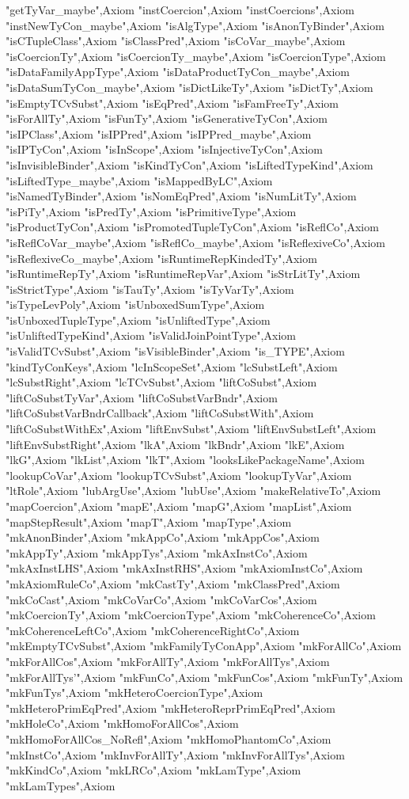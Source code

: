 {"getTyVar_maybe"},{Axiom "instCoercion"},{Axiom "instCoercions"},{Axiom "instNewTyCon_maybe"},{Axiom "isAlgType"},{Axiom "isAnonTyBinder"},{Axiom "isCTupleClass"},{Axiom "isClassPred"},{Axiom "isCoVar_maybe"},{Axiom "isCoercionTy"},{Axiom "isCoercionTy_maybe"},{Axiom "isCoercionType"},{Axiom "isDataFamilyAppType"},{Axiom "isDataProductTyCon_maybe"},{Axiom "isDataSumTyCon_maybe"},{Axiom "isDictLikeTy"},{Axiom "isDictTy"},{Axiom "isEmptyTCvSubst"},{Axiom "isEqPred"},{Axiom "isFamFreeTy"},{Axiom "isForAllTy"},{Axiom "isFunTy"},{Axiom "isGenerativeTyCon"},{Axiom "isIPClass"},{Axiom "isIPPred"},{Axiom "isIPPred_maybe"},{Axiom "isIPTyCon"},{Axiom "isInScope"},{Axiom "isInjectiveTyCon"},{Axiom "isInvisibleBinder"},{Axiom "isKindTyCon"},{Axiom "isLiftedTypeKind"},{Axiom "isLiftedType_maybe"},{Axiom "isMappedByLC"},{Axiom "isNamedTyBinder"},{Axiom "isNomEqPred"},{Axiom "isNumLitTy"},{Axiom "isPiTy"},{Axiom "isPredTy"},{Axiom "isPrimitiveType"},{Axiom "isProductTyCon"},{Axiom "isPromotedTupleTyCon"},{Axiom "isReflCo"},{Axiom "isReflCoVar_maybe"},{Axiom "isReflCo_maybe"},{Axiom "isReflexiveCo"},{Axiom "isReflexiveCo_maybe"},{Axiom "isRuntimeRepKindedTy"},{Axiom "isRuntimeRepTy"},{Axiom "isRuntimeRepVar"},{Axiom "isStrLitTy"},{Axiom "isStrictType"},{Axiom "isTauTy"},{Axiom "isTyVarTy"},{Axiom "isTypeLevPoly"},{Axiom "isUnboxedSumType"},{Axiom "isUnboxedTupleType"},{Axiom "isUnliftedType"},{Axiom "isUnliftedTypeKind"},{Axiom "isValidJoinPointType"},{Axiom "isValidTCvSubst"},{Axiom "isVisibleBinder"},{Axiom "is_TYPE"},{Axiom "kindTyConKeys"},{Axiom "lcInScopeSet"},{Axiom "lcSubstLeft"},{Axiom "lcSubstRight"},{Axiom "lcTCvSubst"},{Axiom "liftCoSubst"},{Axiom "liftCoSubstTyVar"},{Axiom "liftCoSubstVarBndr"},{Axiom "liftCoSubstVarBndrCallback"},{Axiom "liftCoSubstWith"},{Axiom "liftCoSubstWithEx"},{Axiom "liftEnvSubst"},{Axiom "liftEnvSubstLeft"},{Axiom "liftEnvSubstRight"},{Axiom "lkA"},{Axiom "lkBndr"},{Axiom "lkE"},{Axiom "lkG"},{Axiom "lkList"},{Axiom "lkT"},{Axiom "looksLikePackageName"},{Axiom "lookupCoVar"},{Axiom "lookupTCvSubst"},{Axiom "lookupTyVar"},{Axiom "ltRole"},{Axiom "lubArgUse"},{Axiom "lubUse"},{Axiom "makeRelativeTo"},{Axiom "mapCoercion"},{Axiom "mapE"},{Axiom "mapG"},{Axiom "mapList"},{Axiom "mapStepResult"},{Axiom "mapT"},{Axiom "mapType"},{Axiom "mkAnonBinder"},{Axiom "mkAppCo"},{Axiom "mkAppCos"},{Axiom "mkAppTy"},{Axiom "mkAppTys"},{Axiom "mkAxInstCo"},{Axiom "mkAxInstLHS"},{Axiom "mkAxInstRHS"},{Axiom "mkAxiomInstCo"},{Axiom "mkAxiomRuleCo"},{Axiom "mkCastTy"},{Axiom "mkClassPred"},{Axiom "mkCoCast"},{Axiom "mkCoVarCo"},{Axiom "mkCoVarCos"},{Axiom "mkCoercionTy"},{Axiom "mkCoercionType"},{Axiom "mkCoherenceCo"},{Axiom "mkCoherenceLeftCo"},{Axiom "mkCoherenceRightCo"},{Axiom "mkEmptyTCvSubst"},{Axiom "mkFamilyTyConApp"},{Axiom "mkForAllCo"},{Axiom "mkForAllCos"},{Axiom "mkForAllTy"},{Axiom "mkForAllTys"},{Axiom "mkForAllTys'"},{Axiom "mkFunCo"},{Axiom "mkFunCos"},{Axiom "mkFunTy"},{Axiom "mkFunTys"},{Axiom "mkHeteroCoercionType"},{Axiom "mkHeteroPrimEqPred"},{Axiom "mkHeteroReprPrimEqPred"},{Axiom "mkHoleCo"},{Axiom "mkHomoForAllCos"},{Axiom "mkHomoForAllCos_NoRefl"},{Axiom "mkHomoPhantomCo"},{Axiom "mkInstCo"},{Axiom "mkInvForAllTy"},{Axiom "mkInvForAllTys"},{Axiom "mkKindCo"},{Axiom "mkLRCo"},{Axiom "mkLamType"},{Axiom "mkLamTypes"},{Axiom }
